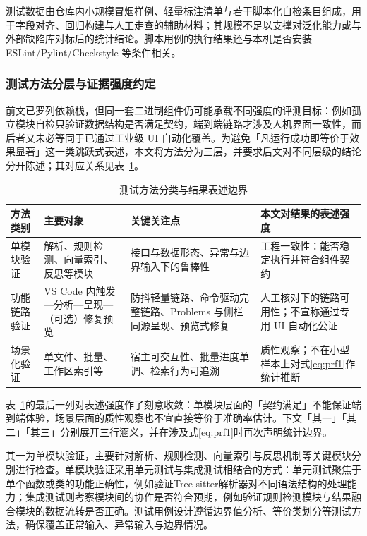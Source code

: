测试数据由仓库内小规模冒烟样例、轻量标注清单与若干脚本化自检条目组成，用于字段对齐、回归构建与人工走查的辅助材料；其规模不足以支撑对泛化能力或与外部缺陷库对标后的统计结论。脚本用例的执行结果还与本机是否安装 ESLint/Pylint/Checkstyle 等条件相关。

\subsubsection{测试方法分层与证据强度约定}

前文已罗列依赖栈，但同一套二进制组件仍可能承载不同强度的评测目标：例如孤立模块自检只验证数据结构是否满足契约，端到端链路才涉及人机界面一致性，而后者又未必等同于已通过工业级 UI 自动化覆盖。为避免「凡运行成功即等价于效果显著」这一类跳跃式表述，本文将方法分为三层，并要求后文对不同层级的结论分开陈述；其对应关系见表~\ref{tab:test-method-taxonomy}\cite{myers2015art}。

\begin{table}[H]
\centering
\small
\setlength{\tabcolsep}{5pt}
\caption{测试方法分类与结果表述边界}
\label{tab:test-method-taxonomy}
\begin{tabular}{p{2.6cm}p{3.6cm}p{3.8cm}p{3.4cm}}
\toprule
方法类别 & 主要对象 & 关键关注点 & 本文对结果的表述强度 \\
\midrule
单模块验证 &
解析、规则检测、向量索引、反思等模块 &
接口与数据形态、异常与边界输入下的鲁棒性 &
工程一致性：能否稳定执行并符合组件契约 \\
\midrule
功能链路验证 &
VS Code 内触发—分析—呈现—（可选）修复预览 &
防抖轻量链路、命令驱动完整链路、Problems 与侧栏同源呈现、预览式修复 &
人工核对下的链路可用性；不宣称通过专用 UI 自动化公证 \\
\midrule
场景化验证 &
单文件、批量、工作区索引等 &
宿主可交互性、批量进度单调、检索行为可追溯 &
质性观察；不在小型样本上对式\eqref{eq:prf1}作统计推断 \\
\bottomrule
\end{tabular}
\end{table}

表~\ref{tab:test-method-taxonomy}的最后一列对表述强度作了刻意收敛：单模块层面的「契约满足」不能保证端到端体验，场景层面的质性观察也不宜直接等价于准确率估计。下文「其一」「其二」「其三」分别展开三行涵义，并在涉及式\eqref{eq:prf1}时再次声明统计边界。

其一为单模块验证，主要针对解析、规则检测、向量索引与反思机制等关键模块分别进行检查。单模块验证采用单元测试与集成测试相结合的方式：单元测试聚焦于单个函数或类的功能正确性，例如验证Tree-sitter解析器对不同语法结构的处理能力；集成测试则考察模块间的协作是否符合预期，例如验证规则检测模块与结果融合模块的数据流转是否正确。测试用例设计遵循边界值分析、等价类划分等测试方法，确保覆盖正常输入、异常输入与边界情况\cite{myers2015art}。

